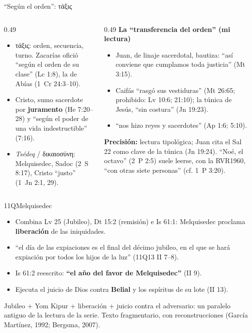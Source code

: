 \documentclass[hyperref={bookmarks=false},aspectratio=169]{beamer}
\newcommand{\grc}[1]{\foreignlanguage{ancientgreek}{#1}}
\newcommand{\destacar}[1]{\textbf{\textcolor{tierraroja}{#1}}}
\newcommand{\precision}[1]{{\footnotesize\color{sepia}\textbf{Precisión:} #1}}
\begin{document}
\begin{frame}{``Según el orden'': \grc{τάξις}}
\begin{columns}[t,onlytextwidth]
\begin{column}{0.49\textwidth}\scriptsize
\begin{itemize}
\item \grc{τάξις}: orden, secuencia, turno. Zacarías ofició ``según el orden de su clase'' (Lc 1:8), la de Abías (1~Cr 24:3--10).
\item Cristo, sumo sacerdote por \destacar{juramento} (He 7:20--28) y ``según el poder de una vida indestructible'' (7:16).
\item \emph{Tsédeq} / \grc{δικαιοσύνη}: Melquisedec, Sadoc (2~S 8:17), Cristo ``justo'' (1~Jn 2:1, 29).
\end{itemize}
\end{column}
\begin{column}{0.49\textwidth}\scriptsize
\destacar{La ``transferencia del orden'' (mi lectura)}
\begin{itemize}
\item Juan, de linaje sacerdotal, bautiza: ``así conviene que cumplamos toda justicia'' (Mt 3:15).
\item Caifás ``rasgó sus vestiduras'' (Mt 26:65; prohibido: Lv 10:6; 21:10); la túnica de Jesús, ``sin costura'' (Jn 19:23).
\item ``nos hizo reyes y sacerdotes'' (Ap 1:6; 5:10).
\end{itemize}
\precision{lectura tipológica; Juan cita el Sal 22 como clave de la túnica (Jn 19:24). ``Noé, el octavo'' (2~P 2:5) suele leerse, con la RVR1960, ``con otras siete personas'' (cf. 1~P 3:20).}
\end{column}
\end{columns}
\end{frame}

\begin{frame}{11QMelquisedec}
\scriptsize
\begin{itemize}
\item Combina Lv 25 (Jubileo), Dt 15:2 (remisión) e Is 61:1: Melquisedec proclama \destacar{liberación} de las iniquidades.
\item ``el día de las expiaciones es el final del décimo jubileo, en el que se hará expiación por todos los hijos de la luz'' (11Q13 II 7--8).
\item Is 61:2 reescrito: \destacar{``el año del favor de Melquisedec''} (II 9).
\item Ejecuta el juicio de Dios contra \destacar{Belial} y los espíritus de su lote (II 13).
\end{itemize}
\begin{tcolorbox}[colback=mostaza!12,colframe=mostaza!80!tierraroja,boxrule=0.6pt,arc=2pt,fontupper=\scriptsize]
Jubileo + Yom Kipur + liberación + juicio contra el adversario: un paralelo antiguo de la lectura de la serie. Texto fragmentario, con reconstrucciones (García Martínez, 1992; Bergsma, 2007).
\end{tcolorbox}
\end{frame}
\end{document}

